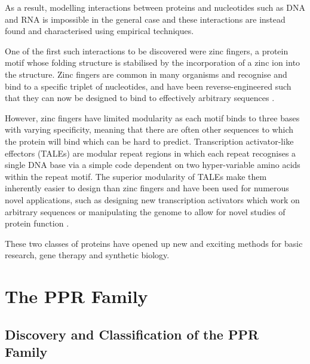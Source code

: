 As a result, modelling interactions between proteins and nucleotides such as
DNA and RNA is impossible in the general case and these interactions are
instead found and characterised using empirical techniques.

One of the first such interactions to be discovered were zinc fingers, a
protein motif whose folding structure is stabilised by the incorporation of a
zinc ion into the structure.
Zinc fingers are common in many organisms and recognise and bind to a specific 
triplet of nucleotides, and have been reverse-engineered such that they can now
be designed to bind to effectively arbitrary sequences \citep{Gaj2013}.

However, zinc fingers have limited modularity as each motif binds to three
bases with varying specificity, meaning that there are often other sequences to
which the protein will bind which can be hard to predict.
Transcription activator-like effectors (TALEs) are modular repeat regions in
which each repeat recognises a single DNA base via a simple code dependent on
two hyper-variable amino acids within the repeat motif.
The superior modularity of TALEs make them inherently easier to design than 
zinc fingers and have been used for
numerous novel applications, such as designing new transcription activators
which work on arbitrary sequences or manipulating the genome to allow for novel
studies of protein function \citep{Sun2013}.

These two classes of proteins have opened up new and exciting methods for basic
research, gene therapy and synthetic biology.

\section{The PPR Family}
\label{sec:review_PPR}
\subsection{Discovery and Classification of the PPR Family}

